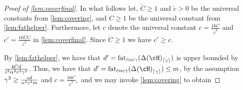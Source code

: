 \begin{proof}[Proof of \cref{lem:coverfinal}]
    In what follows let, $ \check{C}\geq1 $ and $ \check{c} >0$ be the universal constants from \cref{lem:covering}, and $ C \geq1$ be the universal constant from \cref{lem:fathelper}. Furthermore, let $ c $ denote the universal constant $ c=\frac{16C}{\check{c}^{2}} $ and $ c'=\frac{16\check{C}C}{\check{c}^{2}} $  in \cref{lem:coverfinal}. Since $ \check{C}\geq 1$ we have $ c'\geq c.$

   By \cref{lem:fathelper}, we have that $ d'=\fat_{\check{c}\alpha\eps\gamma}(\dlh_{\left\lceil\gamma\right\rceil}) $ is upper bounded by $ \frac{4Cd}{\check{c}^2\alpha^2\varepsilon^2\gamma^2}$.
   Thus, we have that $  d'=\fat_{\check{c}\alpha\eps\gamma}(\dlh_{\left\lceil\gamma\right\rceil})\leq m$, by the assumption $ \gamma^{2}\geq  \frac{cd}{\alpha^{2}\varepsilon^{2}m}$ and $ c=\frac{16C}{\check{c}^{2}},$ and we may invoke \cref{lem:covering} to obtain 
   

\end{proof}
